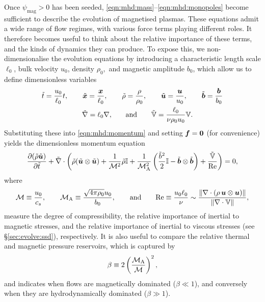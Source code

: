Once $\psi_\mathrm{mag} > 0$ has been seeded, \autoref{eqn:mhd:mass}--\ref{eqn:mhd:monopoles} become sufficient to describe the evolution of magnetised plasmas. These equations admit a wide range of flow regimes, with various force terms playing different roles. It therefore becomes useful to think about the relative importance of these terms, and the kinds of dynamics they can produce. To expose this, we non-dimensionalise the evolution equations by introducing a characteristic length scale $\ell_0$, bulk velocity $u_0$, density $\rho_0,$ and magnetic amplitude $b_0$, which allow us to define dimensionless variables
\begin{align}
    \tilde{t}
        = \frac{u_0}{\ell_0} t
        , \qquad
    \tilde{\bm{x}}
        = \frac{\bm{x}}{\ell_0}
        , \qquad
    \tilde{\rho}
        &= \frac{\rho}{\rho_0}
        , \qquad
    \tilde{\bm{u}}
        = \frac{\bm{u}}{u_0}
        , \qquad
    \tilde{\bm{b}}
        = \frac{\bm{b}}{b_0}
        \\
    \tilde{\nabla}
        = \ell_0 \nabla
        , \qquad &\mbox{and} \qquad
    \tilde{\mathbb{V}}
        = \frac{\ell_0}{\nu \rho_0 u_0} \mathbb{V}
    .
\end{align}
Substituting these into \autoref{eqn:mhd:momentum} and setting $\bm{f} = \bm{0}$ (for convenience) yields the dimensionless momentum equation
\begin{align}
    \frac{\partial (\tilde{\rho} \tilde{\bm{u}})}{\partial \tilde{t}}
        + \tilde{\nabla} \cdot \left( 
            \tilde{\rho} (\tilde{\bm{u}} \otimes \tilde{\bm{u}})
            + \frac{1}{\mathcal{M}^2} \tilde{\rho} \mathbb{I}
            + \frac{1}{\mathcal{M}_{\mathrm{A}}^2} \left( 
                \frac{\tilde{b}^2}{2} \mathbb{I}
                - \tilde{\bm{b}} \otimes \tilde{\bm{b}}
             \right)
            + \frac{\tilde{\mathbb{V}}}{\mathrm{Re}}
         \right)
        = 0
    ,
\end{align}
where
\begin{align}
    \mathcal{M}
        \equiv \frac{u_0}{c_s}
        , \qquad
    \mathcal{M}_{\mathrm{A}}
        \equiv \frac{\sqrt{4\pi\rho_0} u_0}{b_0}
        , \qquad \mbox{and} \qquad
    \mathrm{Re}
        \equiv \frac{u_0\ell_0}{\nu}
        \sim \frac{
            \|\nabla\cdot(\rho\,\bm{u}\otimes\bm{u})\|
        }{
            \|\nabla\cdot\mathbb{V}\|
        }
    ,
    \label{defn:Reh}
\end{align}
measure the degree of compressibility, the relative importance of inertial to magnetic stresses, and the relative importance of inertial to viscous stresses (see \S\ref{sec:evolve:ssd}), respectively. It is also useful to compare the relative thermal and magnetic pressure reservoirs, which is captured by
\begin{align}
    \beta
        \equiv 2 \left( \frac{\mathcal{M}_{\mathrm{A}}}{\mathcal{M}} \right)^2
    , \label{defn:plasma-beta}
\end{align}
and indicates when flows are magnetically dominated ($\beta \ll 1$), and conversely when they are hydrodynamically dominated ($\beta \gg 1$).


